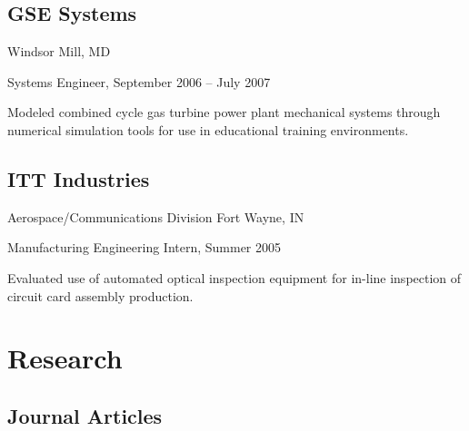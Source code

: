 \documentclass[10pt,letterpaper]{article}
\renewenvironment{itemize}{
  \begin{list}{}{
    \setlength{\leftmargin}{30pt}
    \setlength{\itemsep}{0.2em}
    \setlength{\parskip}{0pt}
    \setlength{\parsep}{0.25em}
  }
}{
  \end{list}
}
\begin{document}
\subsection*{GSE Systems}
Windsor Mill, MD

\begin{itemize}
\item Systems Engineer, September 2006 -- July 2007
    \begin{itemize}
    \item Modeled combined cycle gas turbine power plant mechanical systems
      through numerical simulation tools for use in educational training
      environments.
    \end{itemize}
\end{itemize}

\subsection*{ITT Industries}
Aerospace/Communications Division \hfill Fort Wayne, IN

\begin{itemize}
\item Manufacturing Engineering Intern, Summer 2005
    \begin{itemize}
    \item Evaluated use of automated optical inspection equipment for in-line inspection of circuit card assembly production.
    \end{itemize}
\end{itemize}

\section*{Research}

\titleformat{\subsection}[hang]{\large \it}{}{0pt}{}[]


\newenvironment{biblist}{%
  \begin{list}{}{%
    \setlength{\leftmargin}{50pt}
    \setlength{\itemsep}{0.2em}
    \setlength{\parskip}{0pt}
    \setlength{\parsep}{0.25em}
    \setlength{\itemindent}{-20pt}%
  }
}{\end{list}}

\subsection*{Journal Articles}
\end{document}
